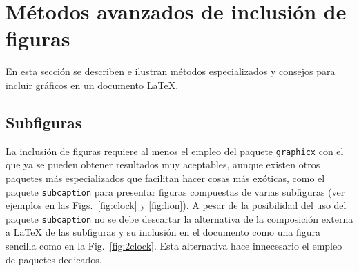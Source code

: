 \documentclass[11pt,a4paper]{article}
\begin{document}














\section{Métodos avanzados de inclusión de figuras}
En esta sección se describen e ilustran métodos especializados y consejos para incluir gráficos en un documento \LaTeX.


\subsection{Subfiguras}
La inclusión de figuras requiere al menos el empleo del paquete \texttt{graphicx} con el que ya se pueden obtener resultados muy aceptables, aunque existen otros paquetes más especializados que facilitan hacer cosas más exóticas, como el paquete \texttt{subcaption} para presentar figuras compuestas de varias subfiguras (ver ejemplos en las Figs.~\ref{fig:clock} y \ref{fig:lion}). A pesar de la posibilidad del uso del paquete \texttt{subcaption} no se debe descartar la alternativa de la composición externa a \LaTeX{} de las subfiguras y su inclusión en el documento como una figura sencilla como en la Fig.~\ref{fig:2clock}. Esta alternativa hace innecesario el empleo de paquetes dedicados.
\end{document}
